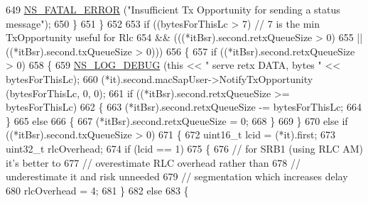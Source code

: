 \begin{DoxyCode}
649                               \hyperlink{group__fatal_ga5131d5e3f75d7d4cbfd706ac456fdc85}{NS\_FATAL\_ERROR} (\textcolor{stringliteral}{"Insufficient Tx Opportunity for sending a
       status message"});
650                             \}
651                         \}
652                         
653                       \textcolor{keywordflow}{if} ((bytesForThisLc > 7)    \textcolor{comment}{// 7 is the min TxOpportunity useful for Rlc}
654                           && (((*itBsr).second.retxQueueSize > 0)
655                               || ((*itBsr).second.txQueueSize > 0)))
656                         \{
657                           \textcolor{keywordflow}{if} ((*itBsr).second.retxQueueSize > 0)
658                             \{
659                               \hyperlink{group__logging_ga413f1886406d49f59a6a0a89b77b4d0a}{NS\_LOG\_DEBUG} (\textcolor{keyword}{this} << \textcolor{stringliteral}{" serve retx DATA, bytes "} << 
      bytesForThisLc);
660                               (*it).second.macSapUser->NotifyTxOpportunity (bytesForThisLc, 0, 0);
661                               \textcolor{keywordflow}{if} ((*itBsr).second.retxQueueSize >= bytesForThisLc)
662                                 \{
663                                   (*itBsr).second.retxQueueSize -= bytesForThisLc;
664                                 \}
665                               \textcolor{keywordflow}{else}
666                                 \{
667                                   (*itBsr).second.retxQueueSize = 0;
668                                 \}
669                             \}
670                           \textcolor{keywordflow}{else} \textcolor{keywordflow}{if} ((*itBsr).second.txQueueSize > 0)
671                             \{
672                               uint16\_t lcid = (*it).first;
673                               uint32\_t rlcOverhead;
674                               \textcolor{keywordflow}{if} (lcid == 1)
675                                 \{
676                                   \textcolor{comment}{// for SRB1 (using RLC AM) it's better to}
677                                   \textcolor{comment}{// overestimate RLC overhead rather than}
678                                   \textcolor{comment}{// underestimate it and risk unneeded}
679                                   \textcolor{comment}{// segmentation which increases delay }
680                                   rlcOverhead = 4;                                  
681                                 \}
682                               \textcolor{keywordflow}{else}
683                                 \{

\end{DoxyCode}
